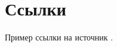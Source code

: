 \documentclass[biblatex]{bmstu-sob}
\begin{document}
\section{Ссылки}

Пример ссылки на источник \cite[с.~4]{knuth1984}.

\bmstuReferencesTitle
\printbibliography[heading=none]
\end{document}
